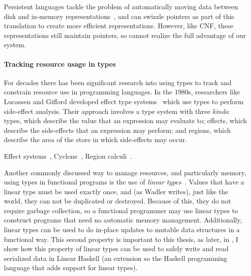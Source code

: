 

{Persistent languages tackle the problem of automatically moving data between disk
and in-memory representations~\cite{persistent-java,persistent-object-systems,persistent-objects-thor}, and can swizzle pointers as part of this
translation to create more efficient representations. However, like CNF, these
representations still maintain pointers, so cannot realize the full advantage of
our system.}

\paragraph{Tracking resource usage in types}


For decades there has been significant research into using types to track and
constrain resource use in programming languages. In the 1980s, researchers like
Lucassen and Gifford developed effect type systems~\cite{effect-types} which use
types to perform side-effect analysis. Their approach involves a type system
with three \emph{kinds}: types, which describe the value that an expression may
evaluate to; effects, which describe the side-effects that an expression may
perform; and regions, which describe the area of the store in which side-effects
may occur.

Effect systems~\cite{effect-types}, Cyclone~\cite{cyclone-pldi}, Region
calculi~\cite{mlkit-retrospective}.

Another commonly discussed way to manage resources, and particularly memory,
using types in functional programs is the use of \emph{linear
types}~\cite{wadler-linear-types}. Values that have a linear type must be used
exactly once, and (as Wadler writes), just like the world, they can not be
duplicated or destroyed. Because of this, they do not require garbage
collection, so a functional programmer may use linear types to construct
programs that need no automatic memory management. Additionally, linear types
can be used to do in-place updates to mutable data structures in a functional
way. This second property is important to this thesis, as later, in
, I show how this property of linear types can be used to
safely write and read serialized data in Linear Haskell (an extension so the Haskell
programming language that adds support for linear types).


